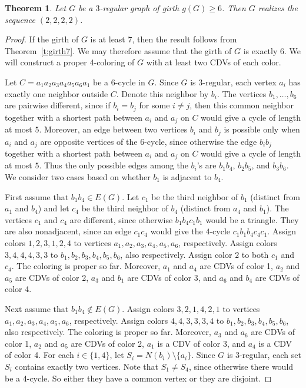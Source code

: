 \documentclass{article}
\newtheorem{theorem}{Theorem}[section]
\theoremstyle{definition}
\begin{document}
\begin{theorem}\label{t:cubicGirth6}
Let $G$ be a $3$-regular graph of girth $g(G)\ge 6$.
Then $G$ realizes the sequence $(2,2,2,2)$.
\end{theorem}

\begin{proof}
If the girth of $G$ is at least $7$, then the result follows from Theorem~\ref{t:girth7}. We may therefore assume that the girth of $G$ is exactly $6$.
We will construct a proper 4-coloring of $G$ with at least two CDVs of each color.

Let $C=a_1a_2a_3a_4a_5a_6a_1$ be a $6$-cycle in $G$.
Since $G$ is $3$-regular, each vertex $a_i$ has exactly one neighbor outside $C$. Denote this neighbor by $b_i$. 
The vertices $b_1,\ldots,b_6$ are pairwise different, since if $b_i=b_j$ for some $i\neq j$, then this common neighbor together with a shortest path between $a_i$ and $a_j$ on $C$ would give a cycle of length at most $5$. 
Moreover, an edge between two vertices $b_i$ and $b_j$ is possible only when $a_i$ and $a_j$ are opposite vertices of the $6$-cycle, since otherwise the edge $b_ib_j$ together with a shortest path between $a_i$ and $a_j$ on $C$ would give a cycle of length at most $5$.
Thus the only possible edges among the $b_i$'s are $b_1b_4$, $b_2b_5$, and $b_3b_6$.
We consider two cases based on whether $b_1$ is adjacent to $b_4$.

\smallskip

First assume that $b_1b_4\in E(G)$. 
Let $c_1$ be the third neighbor of $b_1$ (distinct from $a_1$ and $b_4$) and let $c_4$ be the third neighbor of $b_4$ (distinct from $a_4$ and $b_1$).
The vertices $c_1$ and $c_4$ are different, since otherwise $b_1b_4c_1b_1$ would be a triangle. 
They are also nonadjacent, since an edge $c_1c_4$ would give the $4$-cycle $c_1b_1b_4c_4c_1$.
Assign colors $1,2,3,1,2,4$ to vertices $a_1,a_2,a_3,a_4,a_5,a_6$, respectively.
Assign colors $3,4,4,4,3,3$ to $b_1,b_2,b_3,b_4,b_5,b_6$, also respectively.
Assign color $2$ to both $c_1$ and $c_4$.
The coloring is proper so far.
Moreover, $a_1$ and $a_4$ are CDVs of color 1, $a_2$ and $a_5$ are CDVs of color 2, $a_3$ and $b_1$ are CDVs of color 3, and $a_6$ and $b_4$ are CDVs of color 4.

\smallskip

Next assume that $b_1b_4\not\in E(G)$.
Assign colors $3,2,1,4,2,1$ to vertices $a_1,a_2,a_3,a_4,a_5,a_6$, respectively.
Assign colors $4,4,3,3,3,4$ to $b_1,b_2,b_3,b_4,b_5,b_6$, also respectively.
The coloring is proper so far.
Moreover, $a_3$ and $a_6$ are CDVs of color 1, $a_2$ and $a_5$ are CDVs of color 2, $a_1$ is a CDV of color 3, and $a_4$ is a CDV of color 4.
For each $i\in\{1,4\}$, let $S_i=N(b_i)\setminus\{a_i\}$.
Since $G$ is $3$-regular, each set $S_i$ contains exactly two vertices.
Note that $S_1\neq S_4$, since otherwise there would be a 4-cycle.
So either they have a common vertex or they are disjoint.


\end{proof}
\end{document}
